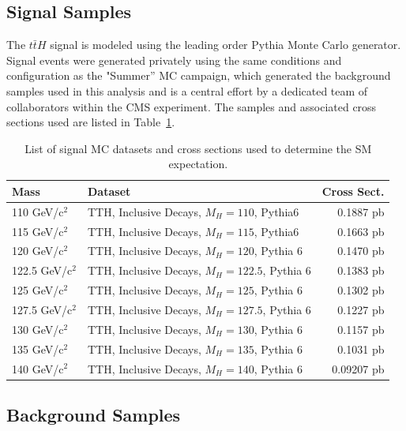 \subsection{Signal Samples}
\label{signal_sample_overview}

\par The $t\bar{t}H$ signal is modeled using the leading order Pythia Monte Carlo
generator.  Signal events were generated privately using the same
conditions and configuration as the "Summer'' MC campaign, which
generated the background samples used in this analysis and is a
central effort by a dedicated team of collaborators within the CMS
experiment.  The samples and associated cross sections used are listed in
Table~\ref{tab:sigSamples}.
 
\begin{table}[hbtp]\footnotesize
\centering
\begin{tabular}{|l|p{}|r|}
\hline\hline
Mass & Dataset & Cross Sect. \\
\hline
110 GeV/c$^2$ & TTH, Inclusive Decays, $M_{H} = 110$, Pythia6 & 0.1887 pb \\
\hline
115 GeV/c$^2$ & TTH, Inclusive Decays, $M_{H} = 115$, Pythia6 & 0.1663 pb \\
\hline
120 GeV/c$^2$ & TTH, Inclusive Decays, $M_{H} = 120$, Pythia 6 & 0.1470 pb \\
\hline
122.5 GeV/c$^2$ & TTH, Inclusive Decays, $M_{H} = 122.5$, Pythia 6 & 0.1383 pb \\
\hline
125 GeV/c$^2$ & TTH, Inclusive Decays, $M_{H} = 125$, Pythia 6 & 0.1302 pb \\
\hline
127.5 GeV/c$^2$ & TTH, Inclusive Decays, $M_{H} = 127.5$, Pythia 6 & 0.1227 pb \\
\hline
130 GeV/c$^2$ & TTH, Inclusive Decays, $M_{H} = 130$, Pythia 6 & 0.1157 pb \\
\hline
135 GeV/c$^2$ & TTH, Inclusive Decays, $M_{H} = 135$, Pythia 6 & 0.1031 pb \\
\hline
140 GeV/c$^2$ & TTH, Inclusive Decays, $M_{H} = 140$, Pythia 6 & 0.09207 pb \\
\hline\hline
\end{tabular}
\caption{List of signal MC datasets and cross sections used to determine the SM expectation.}
\label{tab:sigSamples}
\end{table}


\subsection{Background Samples}
\label{background_sample_overview}


